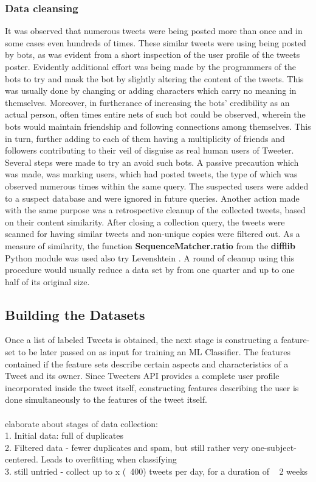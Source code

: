 		\subsubsection*{Data cleansing}
		It was observed that numerous tweets were being posted more than once and in some cases even hundreds of times. These similar tweets were using being posted by bots, as was evident from a short inspection of the user profile of the tweets poster. Evidently additional effort was being made by the programmers of the bots to try and mask the bot by slightly altering the content of the tweets. This was usually done by changing or adding characters which carry no meaning in themselves. Moreover, in furtherance of increasing the bots' credibility as an actual person, often times entire nets of such bot could be observed, wherein the bots would maintain friendship and following connections among themselves. This in turn, further adding to each of them having a multiplicity of friends and followers contributing to their veil of disguise as real human users of Tweeter.
		Several steps were made to try an avoid such bots. A passive precaution which was made, was marking users, which had posted tweets, the type of which was observed numerous times within the same query. The suspected users were added to a suspect database and were ignored in future queries. Another action made with the same purpose was a retrospective cleanup of the collected tweets, based on their content similarity. After closing a collection query, the tweets were scanned for having similar tweets and non-unique copies were filtered out. As a measure of similarity, the function \textbf{SequenceMatcher.ratio} from the \textbf{difflib} Python module was used {\color{red} \Large also try Levenshtein }. A round of cleanup using this procedure would usually reduce a data set by from one quarter and up to one half of its original size.
		
		\newpage
		
	\subsection{Building the Datasets}
	Once a list of labeled Tweets is obtained, the next stage is constructing a feature-set to be later passed on as input for training an ML Classifier. The features contained if the feature sets describe certain aspects and characteristics of a Tweet and its owner. Since Tweeters API provides a complete user profile incorporated inside the tweet itself, constructing features describing the user is done simultaneously to the features of the tweet itself.
	\\~\\
	{\LARGE \color{red}
		elaborate about stages of data collection:
	} \\ 
	{\color{red}
		1. Initial data: full of duplicates\\
		2. Filtered data - fewer duplicates and spam, but still rather very one-subject-centered. Leads to overfitting when classifying \\
		3. still untried - collect up to x (~400) tweets per day, for a duration of ~ 2 weeks
	}
		
